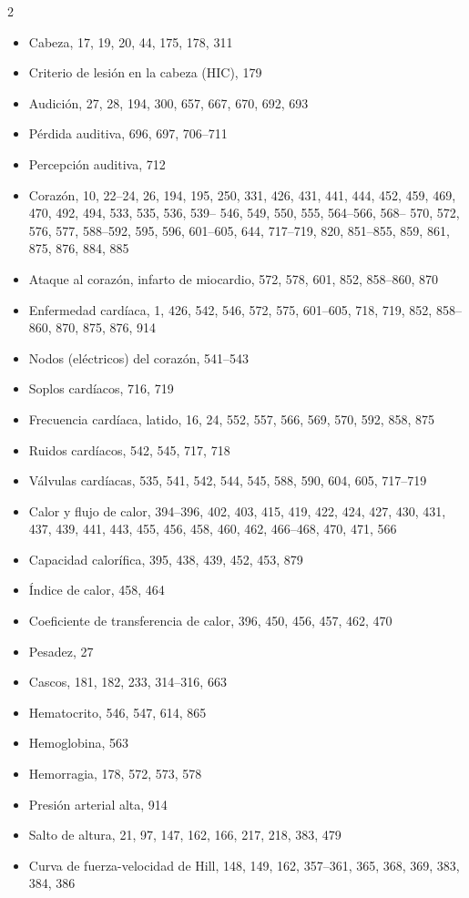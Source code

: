 \documentclass[12pt,a4paper]{book}
\begin{document}
\begin{multicols}{2}
\begin{itemize}[leftmargin=*]
  \item Cabeza, 17, 19, 20, 44, 175, 178, 311
  \item Criterio de lesión en la cabeza (HIC), 179
  \item Audición, 27, 28, 194, 300, 657, 667, 670, 692, 693
  \item Pérdida auditiva, 696, 697, 706--711
  \item Percepción auditiva, 712
  \item Corazón, 10, 22--24, 26, 194, 195, 250, 331, 426, 431, 441, 444, 452, 459, 469, 470, 492, 494, 533, 535, 536, 539-- 546, 549, 550, 555, 564--566, 568-- 570, 572, 576, 577, 588--592, 595, 596, 601--605, 644, 717--719, 820, 851--855, 859, 861, 875, 876, 884, 885
  \item Ataque al corazón, infarto de miocardio, 572, 578, 601, 852, 858--860, 870
  \item Enfermedad cardíaca, 1, 426, 542, 546, 572, 575, 601--605, 718, 719, 852, 858--860, 870, 875, 876, 914
  \item Nodos (eléctricos) del corazón, 541--543
  \item Soplos cardíacos, 716, 719
  \item Frecuencia cardíaca, latido, 16, 24, 552, 557, 566, 569, 570, 592, 858, 875
  \item Ruidos cardíacos, 542, 545, 717, 718
  \item Válvulas cardíacas, 535, 541, 542, 544, 545, 588, 590, 604, 605, 717--719
  \item Calor y flujo de calor, 394--396, 402, 403, 415, 419, 422, 424, 427, 430, 431, 437, 439, 441, 443, 455, 456, 458, 460, 462, 466--468, 470, 471, 566
  \item Capacidad calorífica, 395, 438, 439, 452, 453, 879
  \item Índice de calor, 458, 464
  \item Coeficiente de transferencia de calor, 396, 450, 456, 457, 462, 470
  \item Pesadez, 27
  \item Cascos, 181, 182, 233, 314--316, 663
  \item Hematocrito, 546, 547, 614, 865
  \item Hemoglobina, 563
  \item Hemorragia, 178, 572, 573, 578
  \item Presión arterial alta, 914
  \item Salto de altura, 21, 97, 147, 162, 166, 217, 218, 383, 479
  \item Curva de fuerza-velocidad de Hill, 148, 149, 162, 357--361, 365, 368, 369, 383, 384, 386

\end{itemize}
\end{multicols}
\end{document}
